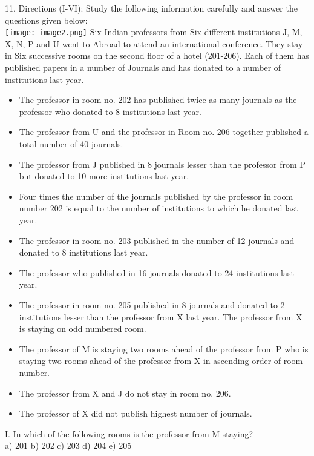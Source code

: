 \documentclass[
]{article}
\begin{document}
11. Directions (I-VI): Study the following information carefully and answer the questions given
below:\\
\texttt{[image: image2.png]}
Six Indian professors from Six different institutions J, M, X, N, P and U went to Abroad to
attend an international conference. They stay in Six successive rooms on the second floor of
a hotel (201-206). Each of them has published papers in a number of Journals and has
donated to a number of institutions last year.\\
\begin{itemize}
\item The professor in room no. 202 has published twice as many journals as the professor
who donated to 8 institutions last year.
\item The professor from U and the professor in Room no. 206 together published a total
number of 40 journals.
\item The professor from J published in 8 journals lesser than the professor from P but
donated to 10 more institutions last year.
\item Four times the number of the journals published by the professor in room number 202 is
equal to the number of institutions to which he donated last year.
\item The professor in room no. 203 published in the number of 12 journals and donated to 8
institutions last year.
\item The professor who published in 16 journals donated to 24 institutions last year.
\item The professor in room no. 205 published in 8 journals and donated to 2 institutions
lesser than the professor from X last year. The professor from X is staying on odd
numbered room.
\item The professor of M is staying two rooms ahead of the professor from P who is staying
two rooms ahead of the professor from X in ascending order of room number.
\item The professor from X and J do not stay in room no. 206.
\item The professor of X did not publish highest number of journals.
\end{itemize}


I. In which of the following rooms is the professor from M staying?\\
a) 201 \hspace{2mm}b) 202 \hspace{2mm}c) 203 \hspace{2mm}d) 204 \hspace{2mm}e) 205\\
\end{document}
